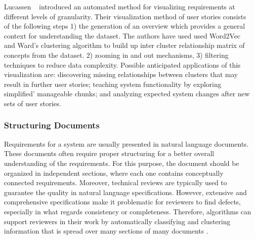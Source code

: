  Lucassen
\etal~\cite{Lucassen:2016} introduced an automated method for visualizing
requirements at different levels of granularity. Their visualization method of
user stories consists of the following steps 1) the generation of an overview
which provides a general context for understanding the dataset. The authors have
used  used Word2Vec and Ward’s clustering algorithm to build up inter cluster
relationship matrix of concepts from the dataset.
2) zooming in and out mechanisms, 3) filtering techniques to reduce data
complexity. Possible anticipated applications of this visualization are:
discovering missing relationships between clusters that may result in further
user stories; teaching system functionality by exploring simplified' manageable
chunks; and analyzing expected system changes after new sets of user stories.

\subsubsection{Structuring Documents} 

Requirements for a system are usually presented in natural language documents.
These documents often require proper structuring for a better overall
understanding of the requirements. For this purpose, the document should be
organized in independent sections, where each one contains conceptually
connected requirements\cite{Ferrari:2013}. Moreover, technical reviews are
typically used to guarantee the quality in natural language specifications.
However, extensive and comprehensive specifications make it problematic for
reviewers to find defects, especially in what regards consistency or
completeness. Therefore, \ML algorithms can support reviewers in their work by
automatically classifying and clustering information that is spread over many
sections of many documents \cite{Ott:2013}.

